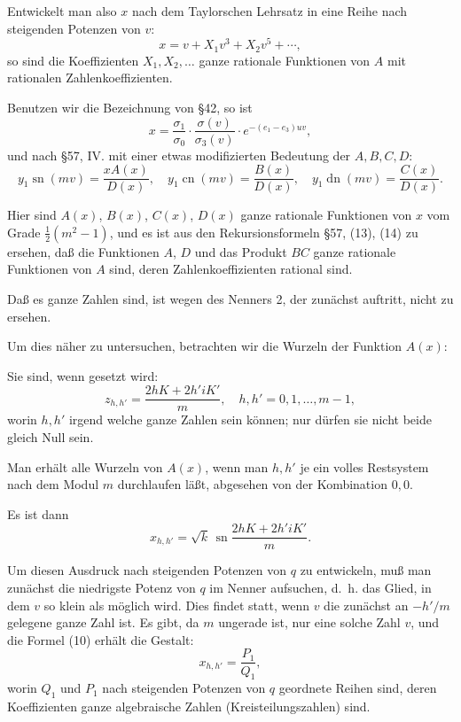 \documentclass[12pt,a4paper]{article}
\begin{document}
Entwickelt man also $x$ nach dem Taylorschen Lehrsatz in eine Reihe nach steigenden Potenzen von $v$:
\begin{equation}x = v + X_1 v^3 + X_2 v^5 + \cdots,\end{equation}
so sind die Koeffizienten $X_1, X_2, \ldots$ ganze rationale Funktionen von $A$ mit rationalen Zahlenkoeffizienten.

Benutzen wir die Bezeichnung von \S 42, so ist
\begin{equation}x = \frac{\sigma_1}{\sigma_0} \cdot \frac{\sigma(v)}{\sigma_3(v)} \cdot e^{-(e_1-e_3)uv},\end{equation}
und nach \S 57, IV. mit einer etwas modifizierten Bedeutung der $A, B, C, D$:
\begin{equation}y_1 \operatorname{sn}(mv) = \frac{x A(x)}{D(x)}, \quad y_1 \operatorname{cn}(mv) = \frac{B(x)}{D(x)}, \quad y_1 \operatorname{dn}(mv) = \frac{C(x)}{D(x)}.\end{equation}

Hier sind $A(x)$, $B(x)$, $C(x)$, $D(x)$ ganze rationale Funktionen von $x$ vom Grade $\frac{1}{2}(m^2-1)$, und es ist aus den Rekursionsformeln \S 57, (13), (14) zu ersehen, da\ss{} die Funktionen $A$, $D$ und das Produkt $BC$ ganze rationale Funktionen von $A$ sind, deren Zahlenkoeffizienten rational sind.

Da\ss{} es ganze Zahlen sind, ist wegen des Nenners 2, der zun\"achst auftritt, nicht zu ersehen.

Um dies n\"aher zu untersuchen, betrachten wir die Wurzeln der Funktion $A(x)$:

Sie sind, wenn gesetzt wird:
\[z_{h,h'} = \frac{2hK + 2h'iK'}{m}, \quad h, h' = 0, 1, \ldots, m-1,\]
worin $h,h'$ irgend welche ganze Zahlen sein k\"onnen; nur d\"urfen sie nicht beide gleich Null sein.

Man erh\"alt alle Wurzeln von $A(x)$, wenn man $h, h'$ je ein volles Restsystem nach dem Modul $m$ durchlaufen l\"a\ss{}t, abgesehen von der Kombination $0,0$.

Es ist dann
\begin{equation}x_{h,h'} = \sqrt{k} \, \operatorname{sn} \frac{2hK + 2h'iK'}{m}.\end{equation}

Um diesen Ausdruck nach steigenden Potenzen von $q$ zu entwickeln, mu\ss{} man zun\"achst die niedrigste Potenz von $q$ im Nenner aufsuchen, d.~h. das Glied, in dem $v$ so klein als m\"oglich wird. Dies findet statt, wenn $v$ die zun\"achst an $-h'/m$ gelegene ganze Zahl ist. Es gibt, da $m$ ungerade ist, nur eine solche Zahl $v$, und die Formel (10) erh\"alt die Gestalt:
\begin{equation}x_{h,h'} = \frac{P_1}{Q_1},\end{equation}
worin $Q_1$ und $P_1$ nach steigenden Potenzen von $q$ geordnete Reihen sind, deren Koeffizienten ganze algebraische Zahlen (Kreisteilungszahlen) sind.
\end{document}
